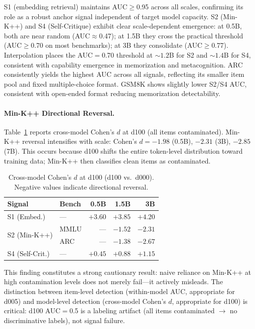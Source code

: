 \documentclass[11pt,a4paper]{article}
\begin{document}
S1 (embedding retrieval) maintains AUC$\geq$0.95 across all scales, confirming its role as a robust anchor signal independent of target model capacity.
S2 (Min-K++) and S4 (Self-Critique) exhibit clear scale-dependent emergence: at 0.5B, both are near random (AUC$\approx$0.47); at 1.5B they cross the practical threshold (AUC$\geq$0.70 on most benchmarks); at 3B they consolidate (AUC$\geq$0.77).
Interpolation places the AUC$=$0.70 threshold at ${\sim}1.2$B for S2 and ${\sim}1.4$B for S4, consistent with capability emergence in memorization and metacognition.
ARC consistently yields the highest AUC across all signals, reflecting its smaller item pool and fixed multiple-choice format.
GSM8K shows slightly lower S2/S4 AUC, consistent with open-ended format reducing memorization detectability.


\paragraph{Min-K++ Directional Reversal.}
Table~\ref{tab:cohens_d} reports cross-model Cohen's $d$ at d100 (all items contaminated).
Min-K++ reversal intensifies with scale: Cohen's $d = -1.98$ (0.5B), $-2.31$ (3B), $-2.85$ (7B).
This occurs because d100 shifts the entire token-level distribution toward training data; Min-K++ then classifies clean items as contaminated.

\begin{table}[t]
\centering
\small
\caption{Cross-model Cohen's $d$ at d100 (d100 vs.\ d000). Negative values indicate directional reversal.}
\label{tab:cohens_d}
\begin{tabular}{llrrr}
\toprule
Signal & Bench & 0.5B & 1.5B & 3B \\
\midrule
S1 (Embed.) & --- & $+3.60$ & $+3.85$ & $+4.20$ \\
\midrule
\multirow{2}{*}{S2 (Min-K++)}
 & MMLU & --- & $-1.52$ & $-2.31$ \\
 & ARC  & --- & $-1.38$ & $-2.67$ \\
\midrule
S4 (Self-Crit.) & --- & $+0.45$ & $+0.88$ & $+1.15$ \\
\bottomrule
\end{tabular}
\end{table}

This finding constitutes a strong cautionary result: naive reliance on Min-K++ at high contamination levels does not merely fail---it actively misleads.
The distinction between item-level detection (within-model AUC, appropriate for d005) and model-level detection (cross-model Cohen's $d$, appropriate for d100) is critical: d100 AUC$=$0.5 is a labeling artifact (all items contaminated $\rightarrow$ no discriminative labels), not signal failure.
\end{document}
